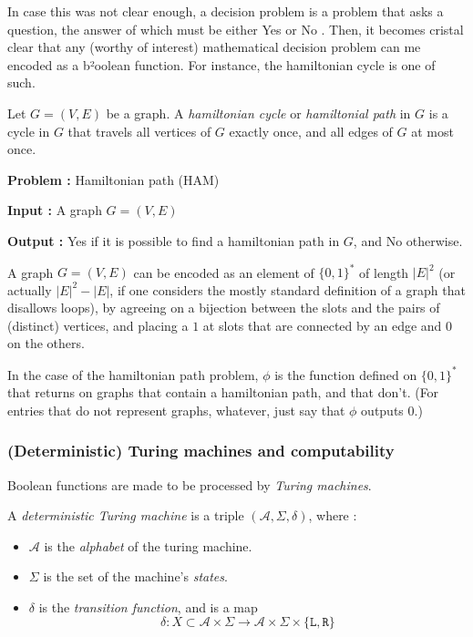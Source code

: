 In case this was not clear enough, a decision problem is a problem that asks a question, the answer of which must be either \og Yes \fg or \og No \fg. Then, it becomes cristal clear that any (worthy of interest) mathematical decision problem can me encoded as a b²oolean function. For instance, the hamiltonian cycle is one of such.

\begin{definition}
    Let $ G = (V,E) $ be a graph. A \textit{hamiltonian cycle} or \textit{hamiltonial path} in $ G $ is a cycle in $ G $ that travels all vertices of $ G $ exactly once, and all edges of $ G $ at most once.
\end{definition}

\begin{problem}
    \textbf{Problem :} Hamiltonian path (HAM)

    \textbf{Input :} A graph $ G = (V,E) $

    \textbf{Output :} \og Yes \fg if it is possible to find a hamiltonian path in $ G $, and \og No \fg otherwise.
\end{problem}

A graph $ G = (V,E) $ can be encoded as an element of $ \{ 0,1 \}^* $ of length $ |E|^2 $ (or actually $ |E|^2 - |E| $, if one considers the mostly standard definition of a graph that disallows loops), by agreeing on a bijection between the slots and the pairs of (distinct) vertices, and placing a $ 1 $ at slots that are connected by an edge and $ 0 $ on the others.

In the case of the hamiltonian path problem, $ \phi $ is the function defined on $ \{ 0,1 \}^* $ that returns  \fg on graphs that contain a hamiltonian path, and  \fg that don't. (For entries that do not represent graphs, whatever, just say that $ \phi $ outputs 0.)

\subsubsection{(Deterministic) Turing machines and computability}

Boolean functions are made to be processed by \textit{Turing machines}.

\begin{definition}
    A \textit{deterministic Turing machine} is a triple $ (\mathcal A, \Sigma, \delta) $, where :
    \begin{itemize}
        \item $ \mathcal A $ is the \textit{alphabet} of the turing machine.
        \item $ \Sigma $ is the set of the machine's \textit{states}.
        \item $ \delta $ is the \textit{transition function}, and is a map
        \[
        \delta : X \subset \mathcal A \times \Sigma \to \mathcal A \times \Sigma \times \{ \texttt{L}, \texttt{R}\}
        \]
    \end{itemize}
\end{definition}


